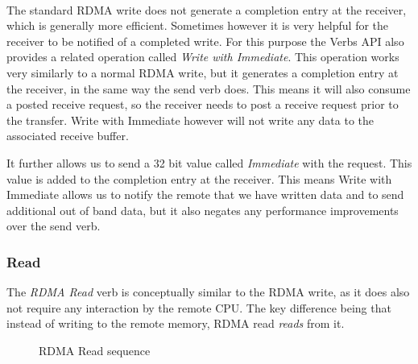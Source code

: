 \paragraph{} The standard RDMA write does not generate a completion entry at the receiver, which is generally more efficient.
Sometimes however it is very helpful for the receiver to be notified of a completed write. For this purpose the Verbs API 
also provides a related operation called \emph{Write with Immediate}.
This operation works very similarly to a normal RDMA write, but it generates a completion entry at the receiver, in the same way 
the send verb does. This means it will also consume a posted receive request, so the receiver needs to post a receive request 
prior to the transfer. Write with Immediate however will not write any data to the associated receive buffer.

It further allows us to send a 32 bit value called \emph{Immediate} with the request. This value is added to
the completion entry at the receiver. This means Write with Immediate allows us to notify the remote that we have written data and to 
send additional out of band data, but it also negates any performance improvements over the send verb.


\subsubsection{Read}

The \emph{RDMA Read} verb is conceptually similar to the RDMA write, as it does also not require any interaction by the 
remote CPU. The key difference being that instead of writing to the remote memory, RDMA read \emph{reads} from it.


\begin{figure}[!htp]
\begin{center}
\end{center}
\caption{RDMA Read sequence}
\label{fig:seq-rd}
\end{figure}

